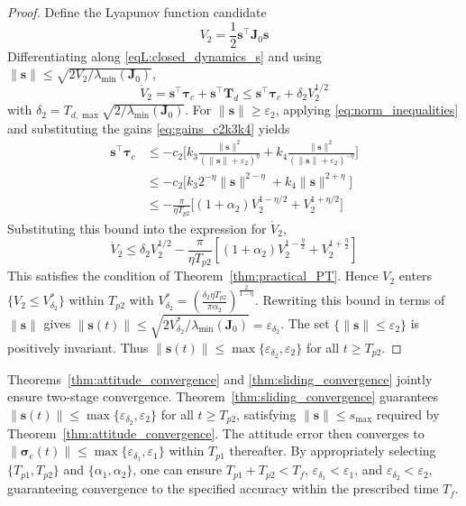 \documentclass[journal]{new-aiaa}
\begin{document}
\begin{proof}
Define the Lyapunov function candidate
\begin{equation}
V_2 = \frac{1}{2}\boldsymbol{s}^\top\boldsymbol{J}_0\boldsymbol{s}
\end{equation}
Differentiating along \eqref{eqL:closed_dynamics_s} and using
$\|\boldsymbol{s}\| \le \sqrt{2V_2/\lambda_{\min}(\boldsymbol{J}_0)}$,
\begin{equation}
\dot{V}_2 = \boldsymbol{s}^\top\boldsymbol{\tau}_c + \boldsymbol{s}^\top\boldsymbol{T}_d
\le \boldsymbol{s}^\top\boldsymbol{\tau}_c + \delta_2 V_2^{1/2}
\end{equation}
with $\delta_2 = T_{d,\max}\sqrt{2/\lambda_{\min}(\boldsymbol{J}_0)}$.
For $\|\boldsymbol{s}\| \ge \varepsilon_2$, applying \eqref{eq:norm_inequalities} and substituting the gains \eqref{eq:gains_c2k3k4} yields
\begin{align}
\boldsymbol{s}^\top\boldsymbol{\tau}_c
&\le -c_2\Big[k_3\frac{\|\boldsymbol{s}\|^2}{(\|\boldsymbol{s}\|+\varepsilon_2)^\eta}
+ k_4\frac{\|\boldsymbol{s}\|^2}{(\|\boldsymbol{s}\|+\varepsilon_2)^{-\eta}}\Big] \nonumber \\
&\le -c_2\big[k_3 2^{-\eta}\|\boldsymbol{s}\|^{2-\eta} + k_4 \|\boldsymbol{s}\|^{2+\eta}\big] \nonumber \\
&\le -\frac{\pi}{\eta T_{p2}}\big[(1+\alpha_2)V_2^{1-\eta/2} + V_2^{1+\eta/2}\big]
\end{align}
Substituting this bound into the expression for $\dot{V}_2$,
\begin{equation}
\dot{V}_2 \le \delta_2 V_2^{1/2}
- \frac{\pi}{\eta T_{p2}}\left[(1+\alpha_2)V_2^{1-\frac{\eta}{2}} + V_2^{1+\frac{\eta}{2}}\right]
\label{eq:V2dot_final}
\end{equation}
This satisfies the condition of Theorem~\ref{thm:practical_PT}. Hence $V_2$ enters $\{V_2\le V^*_{\delta_2}\}$ within $T_{p2}$ with
$V^*_{\delta_2} = (\frac{\delta_2\eta T_{p2}}{\pi\alpha_2})^{\frac{2}{1-\eta}}$.
Rewriting this bound in terms of $\|\boldsymbol{s}\|$ gives $\|\boldsymbol{s}(t)\| \le \sqrt{2V^*_{\delta_2}/\lambda_{\min}(\boldsymbol{J}_0)} = \varepsilon_{\delta_2}$.
The set $\{\|\boldsymbol{s}\|\le\varepsilon_2\}$ is positively invariant.
Thus $\|\boldsymbol{s}(t)\| \le \max\{\varepsilon_{\delta_2},\varepsilon_2\}$ for all $t\ge T_{p2}$.
\end{proof}

Theorems~\ref{thm:attitude_convergence} and \ref{thm:sliding_convergence} jointly ensure two-stage convergence.
Theorem~\ref{thm:sliding_convergence} guarantees $\|\boldsymbol{s}(t)\|\le\max\{\varepsilon_{\delta_2},\varepsilon_2\}$
for all $t\ge T_{p2}$, satisfying $\|\boldsymbol{s}\|\le s_{\max}$ required by
Theorem~\ref{thm:attitude_convergence}.
The attitude error then converges to $\|\boldsymbol{\sigma}_e(t)\|\le\max\{\varepsilon_{\delta_1},\varepsilon_1\}$
within $T_{p1}$ thereafter.
By appropriately selecting $\{T_{p1},T_{p2}\}$ and $\{\alpha_1,\alpha_2\}$, one can ensure
$T_{p1}+T_{p2}<T_f$, $\varepsilon_{\delta_1}<\varepsilon_1$, and $\varepsilon_{\delta_2}<\varepsilon_2$,
guaranteeing convergence to the specified accuracy within the prescribed time $T_f$.
\end{document}
